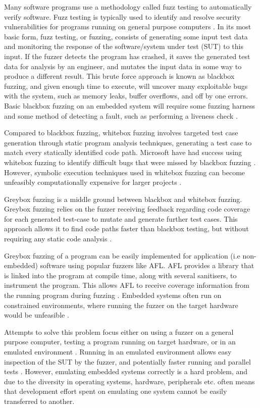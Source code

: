 \documentclass[../report.tex]{subfiles}
\begin{document}
Many software programs use a methodology called fuzz testing to automatically
verify software. Fuzz testing is typically used to identify and resolve
security vulnerabilities for programs running on general purpose computers
\citep{Google_2023}. In its most basic form, fuzz testing, or fuzzing, consists
of generating some input test data and monitoring the response of the
software/system under test (SUT) to this input. If the fuzzer detects the
program has crashed, it saves the generated test data for analysis by an
engineer, and mutates the input data in some way to produce a different result.
This brute force approach is known as blackbox fuzzing, and given enough time
to execute, will uncover many exploitable bugs with the system, such as memory
leaks, buffer overflows, and off by one errors. Basic blackbox fuzzing on an
embedded system will require some fuzzing harness \citep{Eisele_et_al_2022} and
some method of detecting a fault, such as performing a liveness check
\citep{Yun_2022}.

Compared to blackbox fuzzing, whitebox fuzzing involves targeted test case
generation through static program analysis techniques, generating a test case
to match every statically identified code path. Microsoft have had success
using whitebox fuzzing to identify difficult bugs that were missed by
blackbox fuzzing \citep{Godefroid_2012}. However, symbolic execution
techniques used in whitebox fuzzing can become unfeasibly computationally
expensive for larger projects \citep{Krishnamoorthy_2010}.

Greybox fuzzing is a middle ground between blackbox and whitebox fuzzing.
Greybox fuzzing relies on the fuzzer receiving feedback regarding code
coverage for each generated test-case to mutate and generate further test
cases. This approach allows it to find code paths faster than blackbox
testing, but without requiring any static code analysis \citep{Yun_2022}.

Greybox fuzzing of a program can be easily implemented for application (i.e
non-embedded) software using popular fuzzers like AFL. AFL provides a library
that is linked into the program at compile time, along with several sanitisers,
to instrument the program. This allows AFL to receive coverage information from
the running program during fuzzing \citep{AFL_2019}. Embedded systems often run on
constrained environments, where running the fuzzer on the target hardware would
be unfeasible \citep{Yun_2022}.

Attempts to solve this problem focus either on using a fuzzer on a general
purpose computer, testing a program running on target hardware, or in an
emulated environment \citep{Eisele_et_al_2022}. Running in an emulated
environment allows easy inspection of the SUT by the fuzzer, and potentially
faster running and parallel tests \citep{Eisele_et_al_2022}. However, emulating
embedded systems correctly is a hard problem, and due to the diversity in
operating systems, hardware, peripherals etc. often means that development
effort spent on emulating one system cannot be easily transferred to another.
\end{document}
